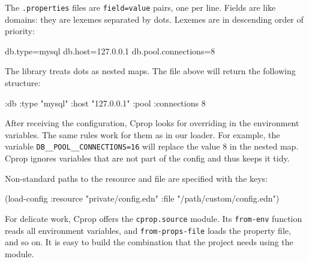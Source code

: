 \else

\begin{english}
\end{english}

\fi

\mnoindent
The \verb|.properties| files are \verb|field=value| pairs, one per line. Fields are like domains: they are lexemes separated by dots. Lexemes are in descending order of priority:

\begin{english}
  \begin{ini}
db.type=mysql
db.host=127.0.0.1
db.pool.connections=8
  \end{ini}
\end{english}

The library treats dots as nested maps. The file above will return the following structure:

\begin{english}
  \begin{clojure}
{:db {:type "mysql"
      :host "127.0.0.1"
      :pool {:connections 8}}}
  \end{clojure}
\end{english}

After receiving the configuration, Cprop looks for overriding in the environment variables. The same rules work for them as in our loader.
For example, the variable \texttt{DB\_\_POOL\_\_CONNEC\-TIONS=16} will replace the value 8 in the nested map. Cprop ignores variables that are not part of the config and thus keeps it tidy.

Non-standard paths to the resource and file are specified with the keys:

\begin{english}
  \begin{clojure}
(load-config
 :resource "private/config.edn"
 :file "/path/custom/config.edn")
  \end{clojure}
\end{english}


For delicate work, Cprop offers the \verb|cprop.source| module. Its \verb|from-env| function reads all environment variables, and \verb|from-props-file| loads the property file, and so on. It is easy to build the combination that the project needs using the module.


